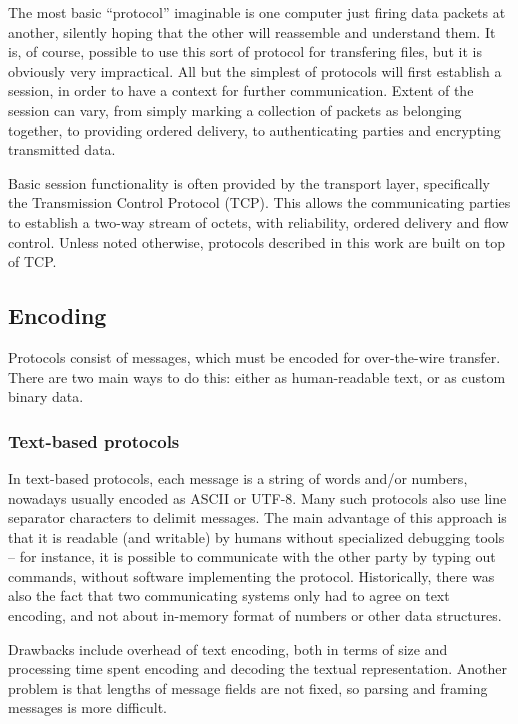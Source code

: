 The most basic ``protocol'' imaginable is one computer just firing data packets at another, silently hoping
that the other will reassemble and understand them. It is, of course, possible to use this sort of protocol
for transfering files, but it is obviously very impractical. All but the simplest of protocols will first
establish a session, in order to have a context for further communication. Extent of the session can vary,
from simply marking a collection of packets as belonging together, to providing ordered delivery, to
authenticating parties and encrypting transmitted data.

Basic session functionality is often provided by the transport layer, specifically the Transmission Control
Protocol (TCP). This allows the communicating parties to establish a two-way stream of octets, with
reliability, ordered delivery and flow control. Unless noted otherwise, protocols described in this work are
built on top of TCP.


\subsection{Encoding}

Protocols consist of messages, which must be encoded for over-the-wire transfer. There are two main ways to do
this: either as human-readable text, or as custom binary data.

\subsubsection{Text-based protocols}

In text-based protocols, each message is a string of words and/or numbers, nowadays usually encoded as ASCII
or UTF-8. Many such protocols also use line separator characters to delimit messages. The main advantage of
this approach is that it is readable (and writable) by humans without specialized debugging tools -- for
instance, it is possible to communicate with the other party by typing out commands, without software
implementing the protocol.  Historically, there was also the fact that two communicating systems only had to
agree on text encoding, and not about in-memory format of numbers or other data structures.

Drawbacks include overhead of text encoding, both in terms of size and processing time spent encoding and
decoding the textual representation. Another problem is that lengths of message fields are not fixed, so
parsing and framing messages is more difficult.

